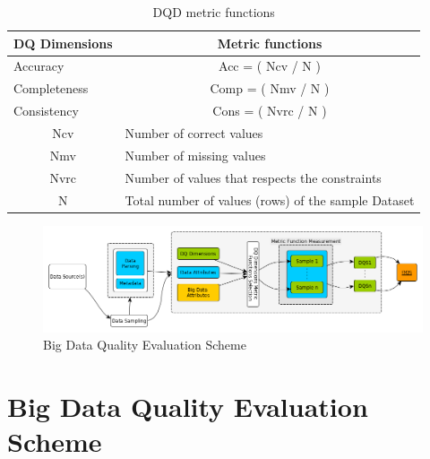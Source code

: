 \begin{table}[ht]
	\centering
	\begin{tabular}{|c|l|}
	\hline
	\rowcolor[HTML]{EFEFEF} 
	\textbf{DQ Dimensions}             & \multicolumn{1}{c|}{\cellcolor[HTML]{EFEFEF}\textbf{Metric functions}} \\ \hline
	\multicolumn{1}{|l|}{Accuracy}     & \multicolumn{1}{c|}{Acc = ( Ncv / N )}                                 \\ \hline
	\multicolumn{1}{|l|}{Completeness} & \multicolumn{1}{c|}{Comp = ( Nmv / N )}                                \\ \hline
	\multicolumn{1}{|l|}{Consistency}  & \multicolumn{1}{c|}{Cons = ( Nvrc / N )}                               \\ \hline
	Ncv                                & Number of correct values                                               \\ \hline
	Nmv                                & Number of missing values                                               \\ \hline
	Nvrc                               & Number of values that respects the constraints                         \\ \hline
	N                                  & Total number of values (rows) of the sample Dataset                    \\ \hline
	\end{tabular}%
\caption{DQD metric functions}
\end{table}

\begin{figure}[h]
	\vspace*{.1in}
	\hspace*{-.7in}
	\centering
	\includegraphics[scale=.55]{big_data_quality_evaluation_scheme}
	\caption{Big Data Quality Evaluation Scheme}    
\end{figure}

\section{Big Data Quality Evaluation Scheme}

